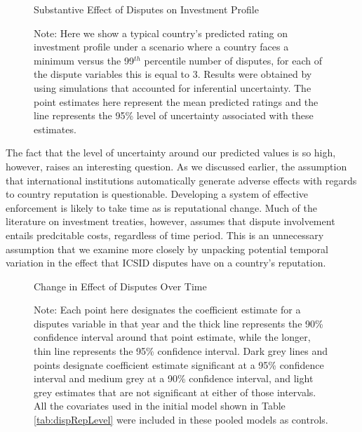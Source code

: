\documentclass[12pt,onesided]{amsart}
\begin{document}

\begin{figure}[ht]
	\centering
	\caption{Substantive Effect of Disputes on Investment Profile}
	\label{fig:subEffect}
	\resizebox{1\textwidth}{!}{}
	\caption*{Note: Here we show a typical country's predicted rating on investment profile under a scenario where a country faces a minimum versus the 99$^{th}$ percentile number of disputes, for each of the dispute variables this is equal to 3. Results were obtained by using simulations that accounted for inferential uncertainty. The point estimates here represent the mean predicted ratings and the line represents the 95\% level of uncertainty associated with these estimates.}
\end{figure}
\FloatBarrier


The fact that the level of uncertainty around our predicted values is so high, however, raises an interesting question. As we discussed earlier, the assumption that international institutions automatically generate adverse effects with regards to country reputation is questionable. Developing a system of effective enforcement is likely to take time as is reputational change. Much of the literature on investment treaties, however, assumes that dispute involvement entails predcitable costs, regardless of time period. This is an unnecessary assumption that we examine more closely by unpacking potential temporal variation in the effect that ICSID disputes have on a country's reputation.

\begin{figure}[ht]
	\centering
	\caption{Change in Effect of Disputes Over Time}
	\label{fig:dispEffectYear}
	\resizebox{1\textwidth}{!}{}
	\caption*{Note: Each point here designates the coefficient estimate for a disputes variable in that year and the thick line represents the 90\% confidence interval around that point estimate, while the longer, thin line represents the 95\% confidence interval. Dark grey lines and points designate coefficient estimate significant at a 95\% confidence interval and medium grey at a 90\% confidence interval, and light grey estimates that are not significant at either of those intervals. All the covariates used in the initial model shown in Table \ref{tab:dispRepLevel} were included in these pooled models as controls.}
\end{figure}
\FloatBarrier
\end{document}
